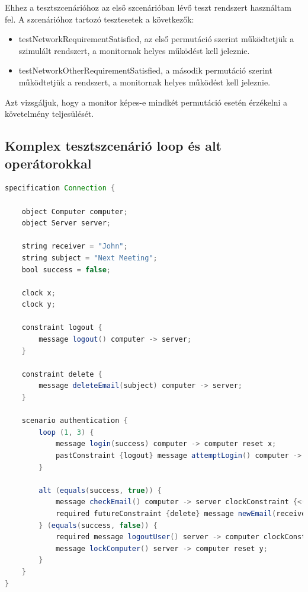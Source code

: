 Ehhez a tesztszcenárióhoz az első szcenárióban lévő teszt rendszert használtam fel.
A szcenárióhoz tartozó tesztesetek a következők:

\begin{itemize}
    \item testNetworkRequirementSatisfied, az első permutáció szerint működtetjük a szimulált rendszert, a monitornak helyes működést kell jeleznie.
    \item testNetworkOtherRequirementSatisfied, a második permutáció szerint működtetjük a rendszert, a monitornak helyes működést kell jeleznie.
\end{itemize}

Azt vizsgáljuk, hogy a monitor képes-e mindkét permutáció esetén érzékelni a követelmény teljesülését.

\subsection{Komplex tesztszcenárió loop és alt operátorokkal}

\begin{lstlisting}[language=java, frame=single, float=ht!, caption={Komplex teszteset szcenáriója.},captionpos=b,label=test_complex_scenario]
specification Connection {

    object Computer computer;
    object Server server;

    string receiver = "John";
    string subject = "Next Meeting";
    bool success = false;

    clock x;
    clock y;

    constraint logout {
        message logout() computer -> server;
    }

    constraint delete {
        message deleteEmail(subject) computer -> server;
    }

    scenario authentication {
        loop (1, 3) {
            message login(success) computer -> computer reset x;
            pastConstraint {logout} message attemptLogin() computer -> server reset y;
        }

        alt (equals(success, true)) {
            message checkEmail() computer -> server clockConstraint {<(x, 2)};
            required futureConstraint {delete} message newEmail(receiver, subject) computer -> server reset x;
        } (equals(success, false)) {
            required message logoutUser() server -> computer clockConstraint {>(y, 3)};
            message lockComputer() server -> computer reset y;
        }
    }
}
\end{lstlisting}


